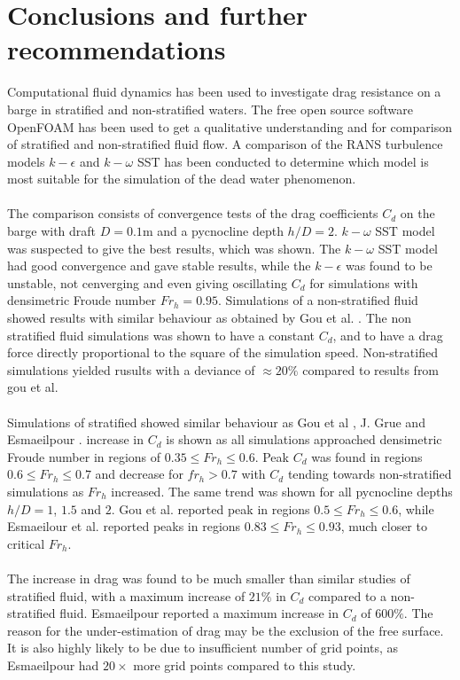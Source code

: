 \documentclass[a4paper, 12pt]{report}
\begin{document}
\chapter{Conclusions and further recommendations}
Computational fluid dynamics has been used to investigate drag resistance on a barge in stratified and non-stratified waters. The free open source software OpenFOAM has been used to get a qualitative understanding and for comparison of stratified and non-stratified fluid flow. A comparison of the RANS turbulence models $k-\epsilon$ and $k-\omega$ SST has been conducted to determine which model is most suitable for the simulation of the dead water phenomenon.\\
\\
 The comparison consists of convergence tests of the drag coefficients $C_d$ on the barge with draft $D=0.1$m and a pycnocline depth $h/D=2$.  $k-\omega$ SST model was suspected to give the best results, which was shown. The $k-\omega$ SST model had good convergence and gave stable results, while the $k-\epsilon$ was found to be unstable, not cenverging and even giving oscillating $C_d$ for simulations with densimetric Froude number $Fr_h= 0.95$.
Simulations of a non-stratified fluid showed results with similar behaviour as obtained by Gou et al. \cite{Gou}. The non stratified fluid simulations was shown to have a constant $C_d$, and to have a drag force directly proportional to the square of the simulation speed. Non-stratified simulations yielded rusults with a deviance of $\approx 20\%$ compared to results from gou et al.\\
\\
Simulations of stratified showed similar behaviour as Gou et al \cite{Gou}, J. Grue \cite{Grue} and Esmaeilpour \cite{Esmaeilpour}.  increase in $C_d$ is shown as all simulations approached densimetric Froude number in regions of $0.35 \leq Fr_h \leq 0.6$. Peak $C_d$ was found in regions $0.6 \leq Fr_h \leq 0.7$ and decrease for $fr_h > 0.7$ with $C_d$ tending towards non-stratified simulations as $Fr_h$ increased. The same trend was shown for all pycnocline depths $h/D=1$, $1.5$ and $2$. Gou et al. reported peak in regions $0.5 \leq Fr_h \leq 0.6$, while Esmaeilour et al. reported peaks in regions $0.83\leq Fr_h \leq 0.93$, much closer to critical $Fr_h$.\\
\\
The increase in drag was found to be much smaller than similar studies of stratified fluid, with a maximum increase of $21\%$ in $C_d$ compared to a non-stratified fluid. Esmaeilpour reported a maximum increase in $C_d$ of $600\%$. The reason for the under-estimation of drag may be the exclusion of the free surface. It is also highly likely to be due to insufficient number of grid points, as Esmaeilpour had $20 \times$ more grid points compared to this study.\\
\end{document}
